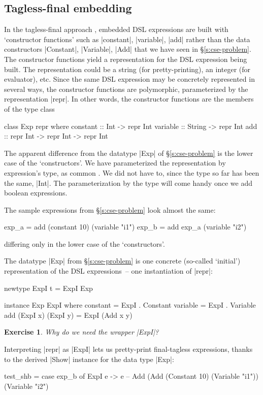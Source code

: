\documentclass[submission,copyright,creativecommons]{eptcs}
\newtheorem{Exercise}{Exercise} \newcommand\aside[1]{}
\begin{document}
\subsection{Tagless-final embedding}
\label{s:tagless-final}

In the tagless-final approach \cite{carette-finally-jfp}, embedded DSL
expressions are built with `constructor functions' such as |constant|,
|variable|, |add| rather than the data constructors |Constant|,
|Variable|, |Add| that we have seen in \S\ref{s:cse-problem}. The
constructor functions yield a representation for the DSL expression
being built. The representation could be a string (for
pretty-printing), an integer (for evaluator), etc. Since the same DSL
expression may be concretely represented in several ways, the
constructor functions are polymorphic, parameterized by the
representation |repr|. In other words, the constructor functions are
the members of the type class
\begin{code}
class Exp repr where
  constant :: Int -> repr Int
  variable :: String -> repr Int
  add      :: repr Int -> repr Int -> repr Int
\end{code}
The apparent difference from the datatype |Exp| of
\S\ref{s:cse-problem} is the lower case of the `constructors'. We have
parameterized the representation by expression's type, as common
\cite{carette-finally-jfp}. We did not have to, since the
type so far has been the same, |Int|. The parameterization by the type
will come handy once we add boolean expressions.

The sample expressions from \S\ref{s:cse-problem} look almost the same:
\begin{code}
exp_a = add (constant 10) (variable "i1")
exp_b = add exp_a (variable "i2")
\end{code}
differing only in the lower case of the `constructors'.

The datatype |Exp| from \S\ref{s:cse-problem} is one concrete
(so-called `initial') representation of the DSL expressions~-- one
instantiation of |repr|:
\begin{code}
newtype ExpI t = ExpI Exp

instance Exp ExpI where
  constant = ExpI . Constant
  variable = ExpI . Variable
  add (ExpI x) (ExpI y) = ExpI (Add x y)
\end{code}
\begin{Exercise}
Why do we need the wrapper |ExpI|?
\end{Exercise}

Interpreting |repr| as |ExpI| lets us pretty-print final-tagless
expressions, thanks to the derived |Show| instance for the data type
|Exp|:
\begin{code}
test_shb = case exp_b of ExpI e -> e
-- Add (Add (Constant 10) (Variable "i1")) (Variable "i2")
\end{code}
\end{document}
